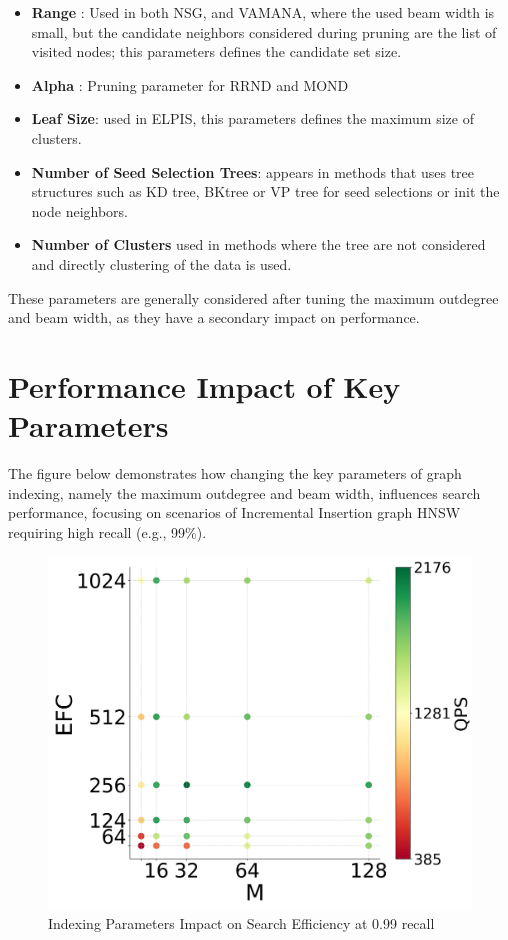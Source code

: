 \begin{itemize}
    \item \textbf{Range} : Used in both NSG, and VAMANA, where the used beam width is small, but the candidate neighbors considered during pruning are the list of visited nodes; this parameters defines the candidate set size.
    \item \textbf{Alpha} : Pruning parameter for RRND and MOND
    \item \textbf{Leaf Size}: used in ELPIS, this parameters defines the maximum size of clusters.
    \item \textbf{Number of Seed Selection Trees}: appears in methods that uses tree structures such as KD tree, BKtree or VP tree for seed selections or init the node neighbors.
    \item \textbf{Number of Clusters} used in methods where the tree are not considered and directly clustering of the data is used.
\end{itemize}

These parameters are generally considered after tuning the maximum outdegree and beam width, as they have a secondary impact on performance.

\section*{Performance Impact of Key Parameters}

The figure below demonstrates how changing the key parameters of graph indexing, namely the maximum outdegree and beam width, influences search performance, focusing on scenarios of Incremental Insertion graph HNSW requiring high recall (e.g., 99\%).

\begin{figure}
    \centering
    \includegraphics[width=0.7\linewidth]{img/Experiments/search/parametershnsw.png}
    \caption{Indexing Parameters Impact on Search Efficiency at 0.99 recall}
    \label{fig:prmhnsw}
\end{figure}

